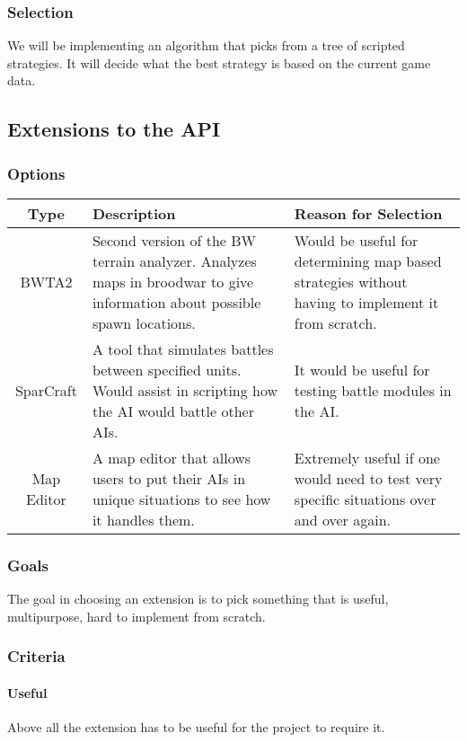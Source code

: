 \documentclass[10pt,letterpaper,onecolumn,draftclsnofoot]{IEEEtran}
\begin{document}
\subsubsection{Selection}
We will be implementing an algorithm that picks from a tree of scripted strategies. It will decide what the best strategy is based on the current game data.


\subsection{Extensions to the API}
\subsubsection{Options}
\begin{center}
	\begin{tabular}{ ||C|L|L|| } 
		\hline
		Type & Description & Reason for Selection \\
		\hline
		BWTA2 & Second version of the BW terrain analyzer. Analyzes maps in broodwar to give information about possible spawn locations. & Would be useful for determining map based strategies without having to implement it from scratch. \\ 
		\hline
		SparCraft & A tool that simulates battles between specified units. Would assist in scripting how the AI would battle other AIs. & It would be useful for testing battle modules in the AI. \\ 
		\hline
		Map Editor & A map editor that allows users to put their AIs in unique situations to see how it handles them. & Extremely useful if one would need to test very specific situations over and over again. \\ 
		\hline
	\end{tabular}
\end{center}
\subsubsection{Goals}
The goal in choosing an extension is to pick something that is useful, multipurpose, hard to implement from scratch.
\subsubsection{Criteria}
\paragraph{Useful}
Above all the extension has to be useful for the project to require it.
\end{document}
